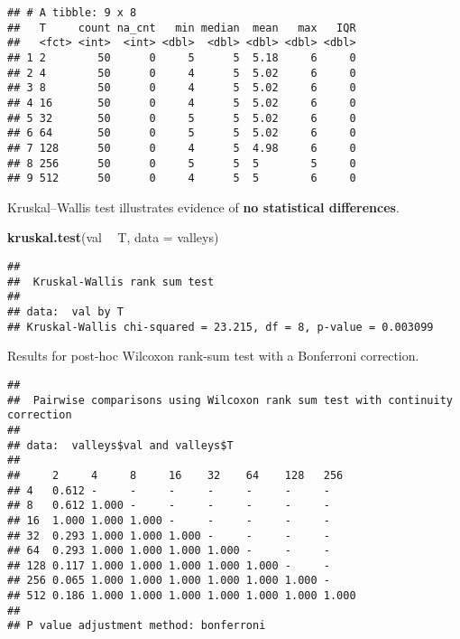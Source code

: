 \documentclass[]{book}
\newenvironment{Shaded}{\begin{snugshade}}{\end{snugshade}}
\newcommand{\DataTypeTok}[1]{\textcolor[rgb]{0.13,0.29,0.53}{#1}}
\newcommand{\KeywordTok}[1]{\textcolor[rgb]{0.13,0.29,0.53}{\textbf{#1}}}
\newcommand{\NormalTok}[1]{#1}
\newcommand{\OperatorTok}[1]{\textcolor[rgb]{0.81,0.36,0.00}{\textbf{#1}}}
\newcommand{\OtherTok}[1]{\textcolor[rgb]{0.56,0.35,0.01}{#1}}
\newcommand{\StringTok}[1]{\textcolor[rgb]{0.31,0.60,0.02}{#1}}
\begin{document}
\begin{verbatim}
## # A tibble: 9 x 8
##   T     count na_cnt   min median  mean   max   IQR
##   <fct> <int>  <int> <dbl>  <dbl> <dbl> <dbl> <dbl>
## 1 2        50      0     5      5  5.18     6     0
## 2 4        50      0     4      5  5.02     6     0
## 3 8        50      0     4      5  5.02     6     0
## 4 16       50      0     4      5  5.02     6     0
## 5 32       50      0     5      5  5.02     6     0
## 6 64       50      0     5      5  5.02     6     0
## 7 128      50      0     4      5  4.98     6     0
## 8 256      50      0     5      5  5        5     0
## 9 512      50      0     4      5  5        6     0
\end{verbatim}

Kruskal--Wallis test illustrates evidence of \textbf{no statistical differences}.

\begin{Shaded}
\begin{Highlighting}[]
\KeywordTok{kruskal.test}\NormalTok{(val }\OperatorTok{~}\StringTok{ }\NormalTok{T, }\DataTypeTok{data =}\NormalTok{ valleys)}
\end{Highlighting}
\end{Shaded}

\begin{verbatim}
## 
##  Kruskal-Wallis rank sum test
## 
## data:  val by T
## Kruskal-Wallis chi-squared = 23.215, df = 8, p-value = 0.003099
\end{verbatim}

Results for post-hoc Wilcoxon rank-sum test with a Bonferroni correction.

\begin{Shaded}
\end{Shaded}

\begin{verbatim}
## 
##  Pairwise comparisons using Wilcoxon rank sum test with continuity correction 
## 
## data:  valleys$val and valleys$T 
## 
##     2     4     8     16    32    64    128   256  
## 4   0.612 -     -     -     -     -     -     -    
## 8   0.612 1.000 -     -     -     -     -     -    
## 16  1.000 1.000 1.000 -     -     -     -     -    
## 32  0.293 1.000 1.000 1.000 -     -     -     -    
## 64  0.293 1.000 1.000 1.000 1.000 -     -     -    
## 128 0.117 1.000 1.000 1.000 1.000 1.000 -     -    
## 256 0.065 1.000 1.000 1.000 1.000 1.000 1.000 -    
## 512 0.186 1.000 1.000 1.000 1.000 1.000 1.000 1.000
## 
## P value adjustment method: bonferroni
\end{verbatim}
\end{document}
